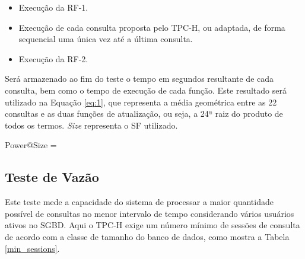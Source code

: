 \begin{itemize}
	\item Execução da RF-1.
	\item Execução de cada consulta proposta pelo TPC-H, ou adaptada, de forma sequencial uma única vez até a última consulta.
	\item Execução da RF-2.
\end{itemize}

Será armazenado ao fim do teste o tempo em segundos resultante de cada consulta, bem como o tempo de execução de cada função. Este resultado será utilizado na Equação \ref{eq:1}, que representa a média geométrica entre as 22 consultas e as duas funções de atualização, ou seja, a 24ª raiz do produto de todos os termos. \textit{Size} representa o SF utilizado.

\begin{myequation}%
\label{eq:1}
{\scriptstyle Power@Size} =  %
\end{myequation}
%

\subsection{Teste de Vazão}
\label{through_test}
Este teste mede a capacidade do sistema de processar a maior quantidade possível de consultas no menor intervalo de tempo considerando vários usuários ativos no SGBD. Aqui o TPC-H exige um número mínimo de sessões de consulta de acordo com a classe de tamanho do banco de dados, como mostra a Tabela \ref{min_sessions}.

